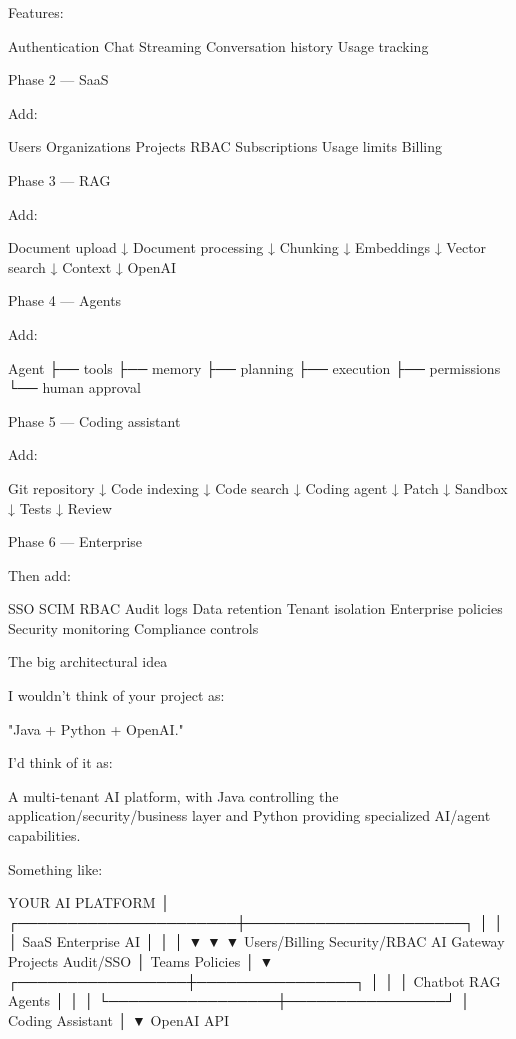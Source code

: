 Features:

    Authentication
    Chat
    Streaming
    Conversation history
    Usage tracking

Phase 2 — SaaS

Add:

Users
Organizations
Projects
RBAC
Subscriptions
Usage limits
Billing

Phase 3 — RAG

Add:

Document upload
       ↓
Document processing
       ↓
Chunking
       ↓
Embeddings
       ↓
Vector search
       ↓
Context
       ↓
OpenAI

Phase 4 — Agents

Add:

Agent
 ├── tools
 ├── memory
 ├── planning
 ├── execution
 ├── permissions
 └── human approval

Phase 5 — Coding assistant

Add:

Git repository
      ↓
Code indexing
      ↓
Code search
      ↓
Coding agent
      ↓
Patch
      ↓
Sandbox
      ↓
Tests
      ↓
Review

Phase 6 — Enterprise

Then add:

SSO
SCIM
RBAC
Audit logs
Data retention
Tenant isolation
Enterprise policies
Security monitoring
Compliance controls

The big architectural idea

I wouldn't think of your project as:

    "Java + Python + OpenAI."

I'd think of it as:

    A multi-tenant AI platform, with Java controlling the application/security/business layer and Python providing specialized AI/agent capabilities.

Something like:

                       YOUR AI PLATFORM
                              │
       ┌──────────────────────┼──────────────────────┐
       │                      │                      │
     SaaS                  Enterprise              AI
       │                      │                      │
       ▼                      ▼                      ▼
   Users/Billing          Security/RBAC        AI Gateway
   Projects               Audit/SSO             │
   Teams                   Policies              │
                                                ▼
                              ┌─────────────────┼────────────────┐
                              │                 │                │
                           Chatbot             RAG             Agents
                              │                 │                │
                              └─────────────────┼────────────────┘
                                                │
                                         Coding Assistant
                                                │
                                                ▼
                                           OpenAI API

